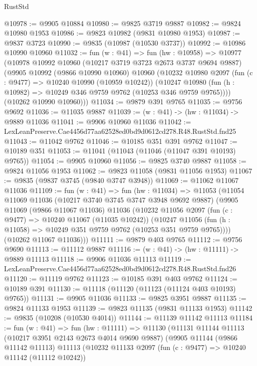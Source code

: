 \begin{lexlean}{RustStd}
\begin{coremodule}
@10978 := @9905 @10884
@10980 := @9825 @3719 @9887
@10982 := @9824 @10980 @1953
@10986 := @9823 @10982 (@9831 @10980 @1953)
@10987 := @9837 @3723
@10990 := @9835 (@10987 (@10530 @3737))
@10992 := @10986 @10990 @10960
@11032 := fun (w : @41) =>
  fun (hw : @10958) =>
  @10977
    (@10978
      @10992
      @10960
      (@10217 @3719 @3723 @2673 @3737 @9694 @9887)
      (@9905
        @10992
        (@9866 @10990 @10960)
        @10960
        (@10232
          @10980
          @2097
          (fun (c : @9477) => @10240 @10990 (@10959 @10242))
          (@10247 @10980 (fun (h : @10982) => @10249 @346 @9759 @9762 (@10253 @346 @9759 @9765))))
        (@10262 @10990 @10960)))
@11034 := @9879 @391 @9765
@11035 := @9756 @9692
@11036 := @11035 @9887
@11039 := (w : @41) -> (hw : @11034) -> @9889 @11036
@11041 := @9906 @10960 @11036
@11042 := LexLeanPreserve.Cae4456d77aa62528ed0bd9d0612cd278.R48.RustStd.fnd25
@11043 := @11042 @9762
@11046 := @10185 @351 @391 @9762
@11047 := @10189 @351
@11053 := @11041 (@11043 (@11046 (@11047 @391 @10193) @9765))
@11054 := @9905 @10960
@11056 := @9825 @3740 @9887
@11058 := @9824 @11056 @1953
@11062 := @9823 @11058 (@9831 @11056 @1953)
@11067 := @9835 (@9837 @3745 (@9840 @3747 @3948))
@11069 := @11062 @11067 @11036
@11109 := fun (w : @41) =>
  fun (hw : @11034) =>
  @11053
    (@11054
      @11069
      @11036
      (@10217 @3740 @3745 @3747 @3948 @9692 @9887)
      (@9905
        @11069
        (@9866 @11067 @11036)
        @11036
        (@10232
          @11056
          @2097
          (fun (c : @9477) => @10240 @11067 (@11035 @10242))
          (@10247 @11056 (fun (h : @11058) => @10249 @351 @9759 @9762 (@10253 @351 @9759 @9765))))
        (@10262 @11067 @11036)))
@11111 := @9879 @403 @9765
@11112 := @9756 @9690
@11113 := @11112 @9887
@11116 := (w : @41) -> (hw : @11111) -> @9889 @11113
@11118 := @9906 @11036 @11113
@11119 := LexLeanPreserve.Cae4456d77aa62528ed0bd9d0612cd278.R48.RustStd.fnd26
@11120 := @11119 @9762
@11123 := @10185 @391 @403 @9762
@11124 := @10189 @391
@11130 := @11118 (@11120 (@11123 (@11124 @403 @10193) @9765))
@11131 := @9905 @11036
@11133 := @9825 @3951 @9887
@11135 := @9824 @11133 @1953
@11139 := @9823 @11135 (@9831 @11133 @1953)
@11142 := @9835 (@10208 (@10530 @4014))
@11144 := @11139 @11142 @11113
@11184 := fun (w : @41) =>
  fun (hw : @11111) =>
  @11130
    (@11131
      @11144
      @11113
      (@10217 @3951 @2143 @2673 @4014 @9690 @9887)
      (@9905
        @11144
        (@9866 @11142 @11113)
        @11113
        (@10232
          @11133
          @2097
          (fun (c : @9477) => @10240 @11142 (@11112 @10242))

\end{coremodule}
\end{lexlean}
